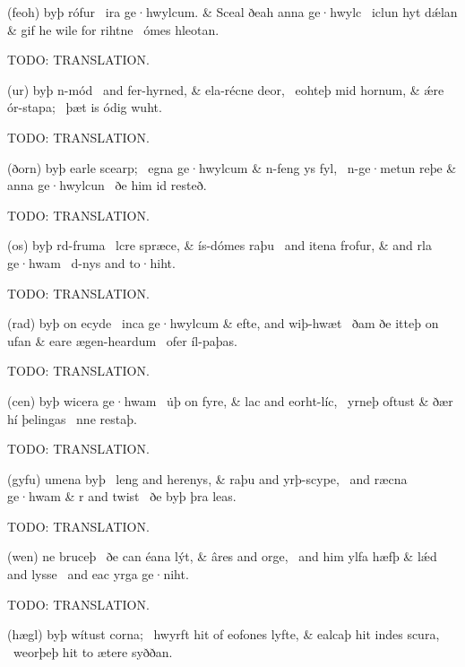 \bvg\bva%
(feoh) byþ rófur \hld\ ira ge·hwylcum. &
Sceal ðeah anna ge·hwylc \hld\ iclun hyt dǽlan &
gif he wile for rihtne \hld\ ómes hleotan.\eva

\bvb TODO: TRANSLATION.\evb\evg


\bvg\bva%
(ur) byþ n-mód \hld\ and fer-hyrned, &
ela-récne deor, \hld\ eohteþ mid hornum, &
ǽre ór-stapa; \hld\ þæt is ódig wuht.\eva

\bvb TODO: TRANSLATION.\evb\evg


\bvg\bva%
(ðorn) byþ earle scearp; \hld\ egna ge·hwylcum &
n-feng ys fyl, \hld\ n-ge·metun reþe &
anna ge·hwylcun \hld\ ðe him id resteð.\eva

\bvb TODO: TRANSLATION.\evb\evg


\bvg\bva%
(os) byþ rd-fruma \hld\ lcre spræce, &
ís-dómes raþu \hld\ and itena frofur, &
and rla ge·hwam \hld\ d-nys and to·hiht.\eva

\bvb TODO: TRANSLATION.\evb\evg


\bvg\bva%
(rad) byþ on ecyde \hld\ inca ge·hwylcum &
efte, and wiþ-hwæt \hld\ ðam ðe itteþ on ufan &
eare ægen-heardum \hld\ ofer íl-paþas.\eva

\bvb TODO: TRANSLATION.\evb\evg


\bvg\bva%
(cen) byþ wicera ge·hwam \hld\ u̇þ on fyre, &
lac and eorht-líc, \hld\ yrneþ oftust &
ðær hí þelingas \hld\ nne restaþ.\eva

\bvb TODO: TRANSLATION.\evb\evg


\bvg\bva%
(gyfu) umena byþ \hld\ leng and herenys, &
raþu and yrþ-scype, \hld\ and ræcna ge·hwam &
r and twist \hld\ ðe byþ þra leas.\eva

\bvb TODO: TRANSLATION.\evb\evg


\bvg\bva%
(wen) ne bruceþ \hld\ ðe can éana lýt, &
âres and orge, \hld\ and him ylfa hæfþ &
lǽd and lysse \hld\ and eac yrga ge·niht.\eva

\bvb TODO: TRANSLATION.\evb\evg


\bvg\bva%
(hægl) byþ wítust corna; \hld\ hwyrft hit of eofones lyfte, &
ealcaþ hit indes scura, \hld\ weorþeþ hit to ætere syððan.\eva

